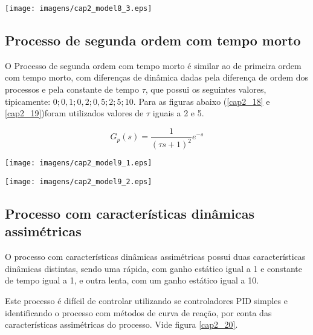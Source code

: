     \begin{center}
        \texttt{[image: imagens/cap2\_model8\_3.eps]}
    \end{center}

\subsection{Processo de segunda ordem com tempo morto}
    
    O Processo de segunda ordem com tempo morto é similar ao de primeira ordem
    com tempo morto, com diferenças de dinâmica dadas pela diferença de ordem
    dos processos e pela constante de tempo $\tau$, que possui os seguintes valores,
    tipicamente: $0; 0,1; 0,2; 0,5; 2; 5; 10$. Para as figuras abaixo
    (\ref{cap2_18} e \ref{cap2_19})foram utilizados valores de $\tau$ iguais
    a 2 e 5.
    
    \begin{equation}
        G_p(s) = \frac{1}{(\tau s +1)^2}e^{-s}
    \end{equation}

    \begin{center}
        \texttt{[image: imagens/cap2\_model9\_1.eps]}
        \label{cap2_18}
    \end{center}
    
    \begin{center}
        \texttt{[image: imagens/cap2\_model9\_2.eps]}
        \label{cap2_19}
    \end{center}

\subsection{Processo com características dinâmicas assimétricas}
    
    O processo com características dinâmicas assimétricas possui duas características
    dinâmicas distintas, sendo uma rápida, com ganho estático igual a 1 e constante
    de tempo igual a 1, e outra lenta, com um ganho estático igual a 10.
    
    Este processo é difícil de controlar utilizando se controladores \acs{PID}
    simples e identificando o processo com métodos de curva de reação, por conta das
    características assimétricas do processo. Vide figura \ref{cap2_20}.
    
